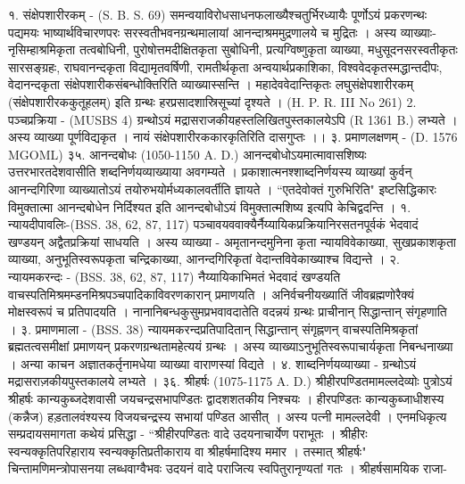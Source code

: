 १. संक्षेपशारीरकम् - (S. B. S. 69)
समन्वयाविरोधसाधनफलाख्यैश्चतुर्भिरध्यायैः पूर्णोऽयं प्रकरणन्थः पद्यमयः भाष्यार्थविचारणपरः सरस्वतीभवनग्रन्थमालायां आनन्दाश्रममुद्रणालये च मुद्रितः । अस्य व्याख्याः-नृसिम्हाश्रमिकृता तत्वबोधिनी, पुरोषोत्तमदीक्षितकृता सुबोधिनी, प्रत्यग्विष्णुकृता व्याख्या, मधुसूदनसरस्वतीकृतः सारसङ्ग्रहः, राघवानन्दकृता विद्यामृतवर्षिणी, रामतीर्थकृता अन्वयार्थप्रकाशिका, विश्ववेदकृतस्मद्धान्तदीपः, वेदानन्दकृता संक्षेपशारीकसंबन्धोक्तिरिति व्याख्यास्सन्ति । महादेववेदान्तिकृतः लघुसंक्षेपशारीरकम् (संक्षेपशारीरककुतूहलम्) इति ग्रन्थः हरप्रसादशास्रिसूच्यां दृश्यते । (H. P. R. III No 261)
2. पञ्चप्रक्रिया - (MUSBS 4)
ग्रन्थोऽयं मद्रासराजकीयहस्तलिखितपुस्तकालयेऽपि (R 1361 B.) लभ्यते । अस्य व्याख्या पूर्णविद्यकृत । नायं संक्षेपशारीरककारकृतिरिति दासगुप्तः ।।
३. प्रमाणलक्षणम् - (D. 1576 MGOML)
३५. आनन्दबोधः (1050-1150 A. D.)
आनन्दबोधोऽयमात्मावासशिष्यः उत्तरभारतदेशवासीति शब्दनिर्णयव्याख्याया अवगम्यते । प्रकाशात्मनश्शाब्दनिर्णयस्य व्याख्यां कुर्वन् आनन्दगिरिणा व्याख्यातोऽयं तयोरुभयोर्मध्यकालवर्तीति ज्ञायते । ``एतदेवोक्तं गुरुभिरिति" इष्टसिद्धिकारः विमुक्तात्मा आनन्दबोधेन निर्दिश्यत इति आनन्दबोधोऽयं विमुक्तात्मशिष्य इत्यपि केचिद्वदन्ति ।
१. न्यायदीपावलिः-(BSS. 38, 62, 87, 117)
पञ्चावयववाक्यैर्नैय्यायिकप्रक्रियानिरसतनपूर्वकं भेदवादं खण्डयन् अद्वैतप्रक्रियां साधयति । अस्य व्याख्या - अमृतानन्दमुनिना कृता न्यायविवेकाख्या, सुखप्रकाशकृता व्याख्या, अनुभूतिस्वरूपकृता चन्द्रिकाख्या, आनन्दगिरिकृतां वेदान्तविवेकाख्याश्च विद्यन्ते ।
२. न्यायमकरन्दः - (BSS. 38, 62, 87, 117)
नैय्यायिकाभिमतं भेदवादं खण्डयति वाचस्पतिमिश्रमम्डनमिश्रपञ्चपादिकाविवरणकारान् प्रमाणयति । अनिर्वचनीयख्यातिं जीवब्रह्मणोरैक्यं मोक्षस्वरूपं च प्रतिपादयति । नानानिबन्धकुसुमप्रभवावदातेति वदन्नयं ग्रन्थः प्राचीनान् सिद्धान्तान् संगृहणाति ।
३. प्रमाणमाला - (BSS. 38)
न्यायमकरन्दप्रतिपादितान् सिद्धान्तान् संगृह्नणन् वाचस्पतिमिश्रकृतां ब्रह्मतत्वसमीक्षां प्रमाणयन् प्रकरणग्रन्थतामहेत्ययं ग्रन्थः । अस्य व्याख्याऽनुभूतिस्वरूपाचार्यकृता निबन्धनाख्या । अन्या काचन अज्ञातकर्तृनामधेया व्याख्या वाराणस्यां विद्यते ।
४. शाब्दनिर्णयव्याख्या - ग्रन्थोऽयं मद्रासराज़कीयपुस्तकालये लभ्यते ।
३६. श्रीहर्षः (1075-1175 A. D.)
श्रीहीरपण्डितमामल्लदेव्योः पुत्रोऽयं श्रीहर्षः कान्यकुब्जदेशवासी जयचन्द्रसभापण्डितः द्वादशशतकीय निश्चयः ।
हीरपण्डितः कान्यकुब्जाधीशस्य (कन्नैज) हड़तालवंश्यस्य विजयचन्द्रस्य सभायां पण्डित आसीत् । अस्य पत्नी मामल्लदेवी । एनमधिकृत्य सम्प्रदायसमागता कथेयं प्रसिद्धा - ``श्रीहीरपण्डितः वादे उदयनाचार्येण पराभूतः । श्रीहीरः स्वन्यक्कृतिपरिहाराय स्वन्यक्कृतिप्रतीकाराय वा श्रीहर्षमादिश्य ममार । तस्मात् श्रीहर्षः" चिन्तामणिमन्त्रोपासनया लब्धवाग्वैभवः उदयनं वादे पराजित्य स्वपितुरानृण्यतां गतः ।
श्रीहर्षसामयिक राजा-
